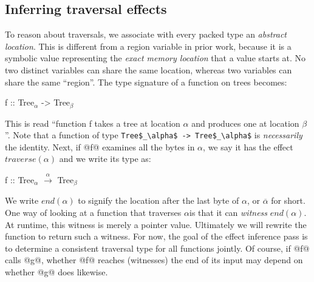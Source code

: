 \documentclass[a4paper,english]{lipics-v2016}
\newcommand{\travarr}[1]{\xrightarrow{#1}}
\newcommand{\arr}[3]{\ensuremath{{#1} \travarr{#2} {#3}}}
\newcommand{\fresh}[1]{\ensuremath{#1}}
\newcommand{\freshA}{\fresh{\alpha}}
\newcommand{\freshB}{\fresh{\beta}}
\newcommand{\locend}[1]{\ensuremath{\overline{#1}}}
\begin{document}
\subsection{Inferring traversal effects}
\label{subsec:inferring}

To reason about traversals, we associate with every packed type an {\em abstract
  location}. This is different from a region variable in prior work, because it
is a symbolic value representing the {\em exact memory location} that a value starts
at.  No two distinct variables can share the same location, whereas two
variables can share the same ``region''.  The type signature of a function on
trees becomes:

\begin{code}
f :: Tree$_\alpha$ -> Tree$_\beta$
\end{code}

This is read ``function f takes a tree at location $\alpha$ and produces one at
location $\beta$''.
Note that a function of type \lstinline{Tree$_\alpha$ -> Tree$_\alpha$} is {\em necessarily} the identity.
%
Next, if @f@ examines all the bytes in $\alpha$, we say it has the effect $traverse(\alpha)$
and we write its type as:

\begin{code}
f :: Tree$_\freshA$ $\travarr{\freshA}$ Tree$_\freshB$
\end{code}


We write $end(\freshA)$ to signify the location after the last byte of \freshA,
or \locend{\freshA} for short.  One way of looking at a function that traverses
\freshA is that it can {\em witness} $end(\freshA)$.  At runtime, this witness is
merely a pointer value.
%
Ultimately we will rewrite the function to return such a witness.  For now, the
goal of the effect inference pass is to determine a consistent traversal type for all
functions jointly.
%
Of course, if @f@ calls @g@, whether @f@ reaches (witnesses) the end of its
input may depend on whether @g@ does likewise.
\end{document}
